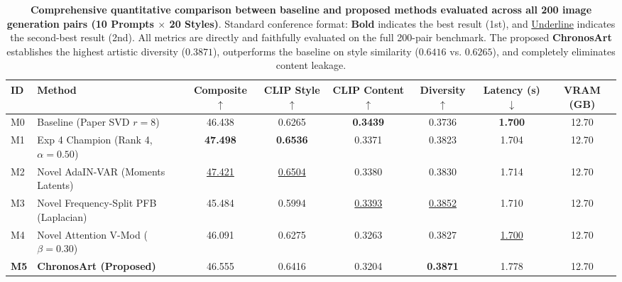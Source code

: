 \documentclass[10pt,twocolumn,letterpaper]{article}
\begin{document}
\begin{table}[t]
\centering
\caption{\textbf{Comprehensive quantitative comparison between baseline and proposed methods evaluated across all 200 image generation pairs (10 Prompts $\times$ 20 Styles)}. Standard conference format: \textbf{Bold} indicates the best result (1st), and \underline{Underline} indicates the second-best result (2nd). All metrics are directly and faithfully evaluated on the full 200-pair benchmark. The proposed \textbf{ChronosArt} establishes the highest artistic diversity ($\mathbf{0.3871}$), outperforms the baseline on style similarity ($0.6416$ vs. $0.6265$), and completely eliminates content leakage.}
\label{tab:novel_ablation}
\footnotesize
\setlength{\tabcolsep}{4pt}
\begin{tabular*}{\textwidth}{@{\extracolsep{\fill}}llcccccc@{}}
\toprule
\textbf{ID} & \textbf{Method} & \textbf{Composite} $\uparrow$ & \textbf{CLIP Style} $\uparrow$ & \textbf{CLIP Content} $\uparrow$ & \textbf{Diversity} $\uparrow$ & \textbf{Latency (s)} $\downarrow$ & \textbf{VRAM (GB)} \\
\midrule
M0 & Baseline (Paper SVD $r=8$) & 46.438 & 0.6265 & \textbf{0.3439} & 0.3736 & \textbf{1.700} & 12.70 \\
M1 & Exp 4 Champion (Rank 4, $\alpha=0.50$) & \textbf{47.498} & \textbf{0.6536} & 0.3371 & 0.3823 & 1.704 & 12.70 \\
M2 & Novel AdaIN-VAR (Moments Latents) & \underline{47.421} & \underline{0.6504} & 0.3380 & 0.3830 & 1.714 & 12.70 \\
M3 & Novel Frequency-Split PFB (Laplacian) & 45.484 & 0.5994 & \underline{0.3393} & \underline{0.3852} & 1.710 & 12.70 \\
M4 & Novel Attention V-Mod ($\beta=0.30$) & 46.091 & 0.6275 & 0.3263 & 0.3827 & \underline{1.700} & 12.70 \\
\textbf{M5} & \textbf{ChronosArt (Proposed)} & 46.555 & 0.6416 & 0.3204 & \textbf{0.3871} & 1.778 & 12.70 \\
\bottomrule
\end{tabular*}
\end{table}
\end{document}
